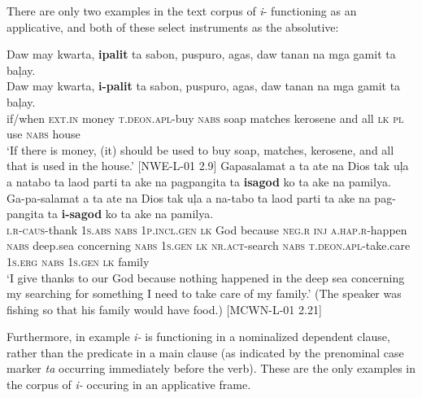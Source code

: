 There are only two examples in the text corpus of \textit{i}{}- functioning as an applicative, and both of these select instruments as the absolutive:

\ea
Daw  may  kwarta,  \textbf{ipalit}  ta  sabon,  puspuro,  agas, daw  tanan  na  mga  gamit  ta  baļay. \\\smallskip
 \gll Daw  may  kwarta,  \textbf{i-palit}  ta  sabon,  puspuro,  agas, daw  tanan  na  mga  gamit  ta  baļay. \\
if/when  \textsc{ext.in}  money  \textsc{t.deon.apl}-buy  \textsc{nabs}  soap  matches  kerosene
and  all  \textsc{lk}  \textsc{pl}  use  \textsc{nabs}  house \\
\glt `If there is money, (it) should be used to buy soap, matches, kerosene, and all that is used in the house.’ [NWE-L-01 2.9]
\z
\ea
\label{bkm:Ref119940330}
Gapasalamat  a  ta  ate  na  Dios  tak  uļa a  natabo  ta  laod  parti  ta  ake  na  pagpangita ta  \textbf{isagod}  ko  ta  ake  na  pamilya. \\\smallskip
 \gll Ga-pa-salamat  a  ta  ate  na  Dios  tak  uļa a  na-tabo  ta  laod  parti  ta  ake  na  pag-pangita ta  \textbf{i-sagod}  ko  ta  ake  na  pamilya. \\
\textsc{i.r}-\textsc{caus}-thank  1\textsc{s.abs}  \textsc{nabs}  1\textsc{p.incl.gen}  \textsc{lk}  God  because  \textsc{neg.r}
\textsc{inj}  \textsc{a.hap.r}-happen \textsc{nabs}  deep.sea  concerning  \textsc{nabs}  1\textsc{s.gen}  \textsc{lk}  \textsc{nr.act-}search
\textsc{nabs}  \textsc{t.deon.apl}-take.care  1\textsc{s.erg}  \textsc{nabs}  1\textsc{s.gen}  \textsc{lk}  family \\
\glt `I give thanks to our God because nothing happened in the deep sea concerning my searching for something I need to take care of my family.’ (The speaker was fishing so that his family would have food.) [MCWN-L-01 2.21]
\z

Furthermore, in example  \textit{i-} is functioning in a nominalized dependent clause, rather than the predicate in a main clause (as indicated by the prenominal case marker \textit{ta} occurring immediately before the verb). These are the only examples in the corpus of \textit{i-} occuring in an applicative frame.

